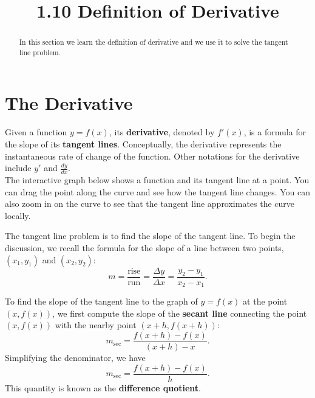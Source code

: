 \documentclass{ximera}
\title{1.10 Definition of Derivative}
\begin{document}
\begin{abstract}
In this section we learn the definition of derivative and we use it to solve the tangent line problem.
\end{abstract}

\maketitle


\section{The Derivative}










Given a function $y = f(x)$, its \textbf{derivative}, denoted by $f'(x)$, is a formula for the slope of 
its \textbf{tangent lines}.
Conceptually, the derivative represents the instantaneous rate of change of the function. 
Other notations for the derivative include $y'$ and $\frac{dy}{dx}$.\\

The interactive graph below shows a function and its tangent line at a point.  
You can drag the point along the curve and see how the tangent line changes.
You can also zoom in on the curve to see that the tangent line approximates the curve
locally.




The tangent line problem is to find the slope of the tangent line.
To begin the discussion, we recall the formula for the slope of a line between two points, $(x_1, y_1)$ 
and $(x_2, y_2)$:
\[m = \frac{\text{rise}}{\text{run}} = \frac{\Delta y}{\Delta x} = \frac{y_2 - y_1}{x_2 - x_1}.\]

To find the slope of the tangent line to the graph of $y = f(x)$ at the point $(x, f(x))$, we first 
compute the slope of the \textbf{secant line} connecting the point $(x, f(x))$ with the 
nearby point $(x+h, f(x+h))$:
\[m_{\text{sec}} = \frac{f(x+h) - f(x)}{(x+h)-x}.\]
Simplifying the denominator, we have
\[m_{\text{sec}} = \frac{f(x+h) - f(x)}{h}.\]
This quantity is known as the \textbf{difference quotient}.
\end{document}
